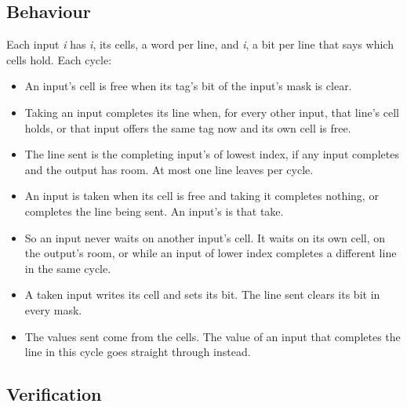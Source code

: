 
\subsection*{Behaviour}

Each input \textit{i} has \textit{i}, its cells, a word per
line, and \textit{i}, a bit per line that says which cells
hold. Each cycle:

\begin{itemize}
\item An input's cell is free when its tag's bit of the input's mask
is clear.
\item Taking an input completes its line when, for every other input,
that line's cell holds, or that input offers the same tag now and its
own cell is free.
\item The line sent is the completing input's of lowest index, if any
input completes and the output has room. At most one line leaves per
cycle.
\item An input is taken when its cell is free and taking it completes
nothing, or completes the line being sent. An input's  is
that take.
\item So an input never waits on another input's cell. It waits on its
own cell, on the output's room, or while an input of lower index
completes a different line in the same cycle.
\item A taken input writes its cell and sets its bit. The line sent
clears its bit in every mask.
\item The values sent come from the cells. The value of an input that
completes the line in this cycle goes straight through instead.
\end{itemize}

\subsection*{Verification}

